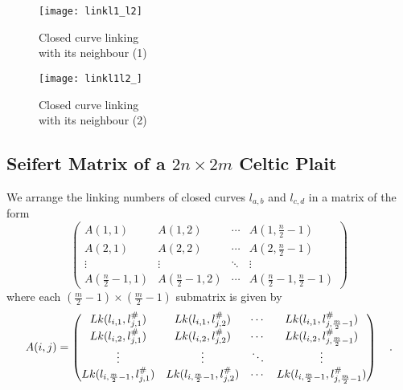 \documentclass[10pt,a4paper]{report}
\theoremstyle{definition}
\theoremstyle{remark}
\theoremstyle{example}
\begin{document}
\begin{figure}[H]
\centering
\begin{minipage}{.5\textwidth}
  \centering
  \graphicspath{{/Users/Imogen/Desktop/seifertimages/lapath/}}
  \texttt{[image: linkl1\_l2]}
   \caption[caption]{Closed curve linking\\\hspace{\textwidth}with its neighbour (1)}
  \label{linkl1_l2}
\end{minipage}%
\begin{minipage}{.5\textwidth}
\centering
  \graphicspath{{/Users/Imogen/Desktop/seifertimages/lapath/}}
  \texttt{[image: linkl1l2\_]}
  \caption[caption]{Closed curve linking\\\hspace{\textwidth}with its neighbour (2)}
  \label{linkl1l2_}
\end{minipage}
\end{figure}

 
\subsection{Seifert Matrix of a $2n\times2m$ Celtic Plait}

We arrange the linking numbers of closed curves $ l_{a,b}$ and $ l_{c,d}$ in a matrix of the form
\begin{equation*}
\left( \begin{array}{c|c|c|c}
A(1,1) & A(1,2) & \cdots & A(1,\frac{n}{2}-1) \\
\hline
A(2,1) & A(2,2) & \cdots & A(2,\frac{n}{2}-1) \\
\hline
\vdots & \vdots & \ddots & \vdots \\
\hline
A(\frac{n}{2}-1,1) & A(\frac{n}{2}-1,2) & \cdots & A(\frac{n}{2}-1,\frac{n}{2}-1)
\end{array} \right)
\end{equation*}
where each $(\frac{m}{2}-1)\times (\frac{m}{2}-1)$ submatrix is given by 
\begin{equation*}
\def\arraystretchfactor{1.2}
A(i,j) = \begin{pmatrix}
Lk(l_{i,1},l_{j,1}^{\#}) & Lk(l_{i,1},l_{j,2}^{\#}) & \cdots & Lk(l_{i,1},l_{j,\frac{m}{2}-1}^{\#}) \\
Lk(l_{i,2},l_{j,1}^{\#}) & Lk(l_{i,2},l_{j,2}^{\#}) & \cdots & Lk(l_{i,2},l_{j,\frac{m}{2}-1}^{\#}) \\
\vdots & \vdots & \ddots & \vdots \\
Lk(l_{i,\frac{m}{2}-1},l_{j,1}^{\#}) & Lk(l_{i,\frac{m}{2}-1},l_{j,2}^{\#}) & \cdots & Lk(l_{i,\frac{m}{2}-1},l_{j,\frac{m}{2}-1}^{\#})
\end{pmatrix}
\quad.
\end{equation*}
\end{document}
